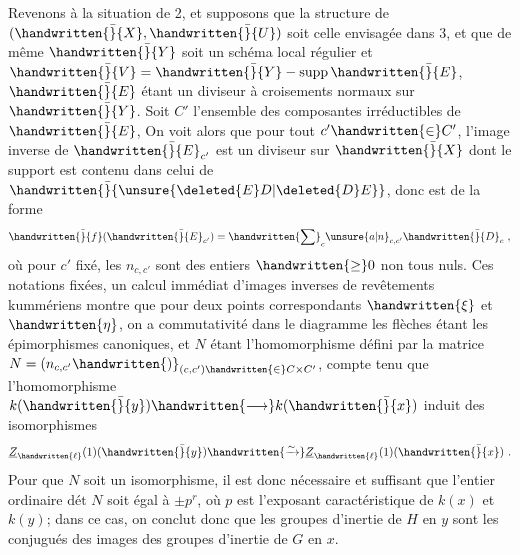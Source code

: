  Revenons à la situation de 2, et supposons que la structure de $(\handwritten{\bar}{X},\handwritten{\bar}{U})$ soit celle envisagée dans 3, et que de même $\handwritten{\bar}{Y}$ soit un schéma local régulier et $\handwritten{\bar}{V}=\handwritten{\bar}{Y}-\operatorname{supp}\handwritten{\bar}{E}$, $\handwritten{\bar}{E}$ étant un diviseur à croisements normaux sur $\handwritten{\bar}{Y}$. Soit $C'$ l'ensemble des composantes irréductibles de $\handwritten{\bar}{E}$, On voit alors que pour tout $c'\handwritten{\in}C'$, l'image inverse de $\handwritten{\bar}{E}_{c'}$ est un diviseur sur $\handwritten{\bar}{X}$ dont le support est contenu dans celui de $\handwritten{\bar}{\unsure{\deleted{E}D|\deleted{D}E}}$, donc est de la forme
\[
\handwritten{\bar}{f}(\handwritten{\bar}{E}_{c'})=\handwritten{\sum}_{c}\unsure{a|n}_{c,c'}\handwritten{\bar}{D}_c\ ,
\]
où pour $c'$ fixé, les $n_{c,c'}$ sont des entiers $\handwritten{\geq}0$ non tous nuls. Ces notations fixées, un calcul immédiat  d'images inverses de revêtements kummériens montre que pour deux points correspondants $\handwritten{\xi}$ et $\handwritten{\eta}$,  on a commutativité dans le diagramme
les flèches  étant les épimorphismes canoniques, et $N$ étant l'homomorphisme défini par la matrice $N=(n_{c,c'}\handwritten{)}_{(c,c')\handwritten{\in}C\mathbin{\times}C'}$, compte tenu que l'homomorphisme $k(\handwritten{\bar}{y})\handwritten{\longrightarrow}k(\handwritten{\bar}{x})$ induit des isomorphismes
\[
\underline{Z}_{\handwritten{\ell}}(1)(\handwritten{\bar}{y})\handwritten{\xrightarrow{\sim}}\underline{Z}_{\handwritten{\ell}}(1)(\handwritten{\bar}{x})\ .
\]
Pour que  $N$ soit un isomorphisme, il est donc nécessaire et suffisant que   l'entier ordinaire $\text{dét }N$ soit égal à $\pm p^r$, où $p$ est l'exposant caractéristique de $k(x)$ et $k(y)$; dans ce cas, on conclut donc que les groupes d'inertie de $H$ en $y$ sont les conjugués des images des groupes d'inertie de $G$ en $x$.

